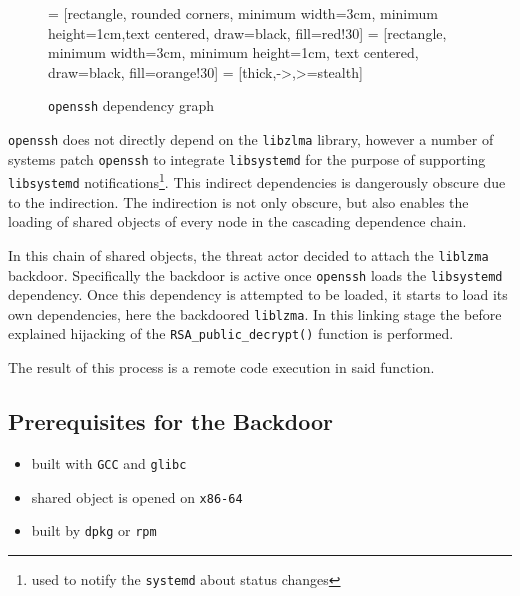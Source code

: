 \begin{figure}[H]
    \centering

     = [rectangle, rounded corners, minimum width=3cm, minimum height=1cm,text centered, draw=black, fill=red!30]
     = [rectangle, minimum width=3cm, minimum height=1cm, text centered, draw=black, fill=orange!30]
     = [thick,->,>=stealth]
    \label{chart:dependecies}
    \caption{\texttt{openssh} dependency graph}
\end{figure}

\texttt{openssh} does not directly depend on the \texttt{libzlma} library,
however a number of systems patch \texttt{openssh} to integrate
\texttt{libsystemd} for the purpose of supporting \texttt{libsystemd}
notifications\footnote{used to notify the \texttt{systemd} about status
changes}. This indirect dependencies is dangerously obscure due to the
indirection. The indirection is not only obscure, but also enables the loading
of shared objects of every node in the cascading dependence chain. 

In this chain of shared objects, the threat actor decided to attach the
\texttt{liblzma} backdoor. Specifically the backdoor is active once
\texttt{openssh} loads the \texttt{libsystemd} dependency. Once this dependency
is attempted to be loaded, it starts to load its own dependencies, here the
backdoored \texttt{liblzma}. In this linking stage the before explained
hijacking of the \texttt{RSA\_public\_decrypt()} function is performed.

The result of this process is a remote code execution in said function.

\subsection{Prerequisites for the Backdoor}

\begin{itemize}
    \item built with \texttt{GCC} and \texttt{glibc}
    \item shared object is opened on \texttt{x86-64}
    \item built by \texttt{dpkg} or \texttt{rpm}
\end{itemize}

